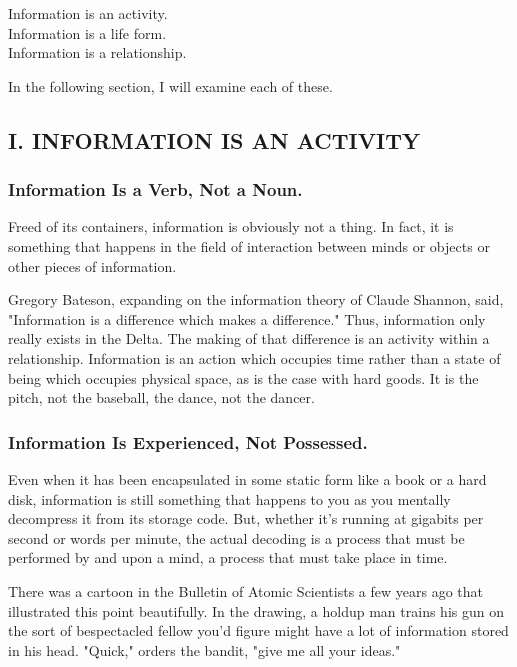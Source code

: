 \documentclass[
]{article}
\begin{document}
Information is an activity.\\
Information is a life form.\\
Information is a relationship.

In the following section, I will examine each of these.

\hypertarget{header-n254}{%
\subsection{I. INFORMATION IS AN ACTIVITY}\label{header-n254}}

\hypertarget{header-n255}{%
\subsubsection{Information Is a Verb, Not a Noun.}\label{header-n255}}

Freed of its containers, information is obviously not a thing. In fact,
it is something that happens in the field of interaction between minds
or objects or other pieces of information.

Gregory Bateson, expanding on the information theory of Claude Shannon,
said, "Information is a difference which makes a difference." Thus,
information only really exists in the Delta. The making of that
difference is an activity within a relationship. Information is an
action which occupies time rather than a state of being which occupies
physical space, as is the case with hard goods. It is the pitch, not the
baseball, the dance, not the dancer.

\hypertarget{header-n258}{%
\subsubsection{Information Is Experienced, Not
Possessed.}\label{header-n258}}

Even when it has been encapsulated in some static form like a book or a
hard disk, information is still something that happens to you as you
mentally decompress it from its storage code. But, whether it's running
at gigabits per second or words per minute, the actual decoding is a
process that must be performed by and upon a mind, a process that must
take place in time.

There was a cartoon in the Bulletin of Atomic Scientists a few years ago
that illustrated this point beautifully. In the drawing, a holdup man
trains his gun on the sort of bespectacled fellow you'd figure might
have a lot of information stored in his head. "Quick," orders the
bandit, "give me all your ideas."
\end{document}
